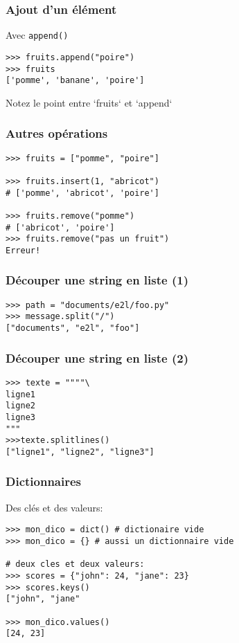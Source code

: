 \documentclass{beamer}
\begin{document}
\begin{frame}[fragile]
  \frametitle{Ajout d'un élément}
Avec \texttt{append()}

\begin{lstlisting}
>>> fruits.append("poire")
>>> fruits
['pomme', 'banane', 'poire']
\end{lstlisting}

\vfill

Notez le point entre `fruits` et `append`
\end{frame}


\begin{frame}[fragile]
  \frametitle{Autres opérations}

\begin{lstlisting}
>>> fruits = ["pomme", "poire"]

>>> fruits.insert(1, "abricot")
# ['pomme', 'abricot', 'poire']

>>> fruits.remove("pomme")
# ['abricot', 'poire']
>>> fruits.remove("pas un fruit")
Erreur!
\end{lstlisting}

\end{frame}

\begin{frame}[fragile]
  \frametitle{Découper une string en liste (1)}

\begin{lstlisting}
>>> path = "documents/e2l/foo.py"
>>> message.split("/")
["documents", "e2l", "foo"]
\end{lstlisting}
\end{frame}

\begin{frame}[fragile]
  \frametitle{Découper une string en liste (2)}
\begin{lstlisting}
>>> texte = """"\
ligne1
ligne2
ligne3
"""
>>>texte.splitlines()
["ligne1", "ligne2", "ligne3"]
\end{lstlisting}
\end{frame}

\begin{frame}[fragile]
  \frametitle{Dictionnaires}

Des clés et des valeurs:

\begin{lstlisting}
>>> mon_dico = dict() # dictionaire vide
>>> mon_dico = {} # aussi un dictionnaire vide

# deux cles et deux valeurs:
>>> scores = {"john": 24, "jane": 23}
>>> scores.keys()
["john", "jane"

>>> mon_dico.values()
[24, 23]
\end{lstlisting}

\end{frame}
\end{document}
